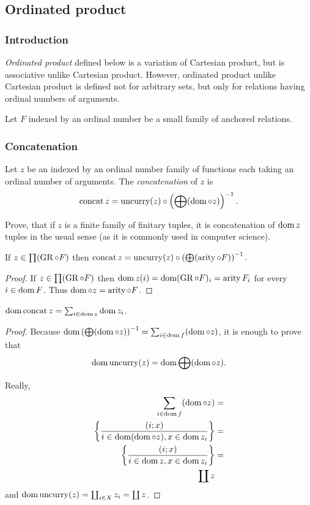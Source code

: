 \subsection{\label{ordinated-prod}Ordinated product}


\subsubsection{Introduction}

\emph{Ordinated product} defined below is a variation of Cartesian
product, but is associative unlike Cartesian product. However, ordinated
product unlike Cartesian product is defined not for arbitrary sets,
but only for relations having ordinal numbers of arguments.

Let $F$ indexed by an ordinal number be a small family of anchored
relations.


\subsubsection{Concatenation}
\begin{defn}
Let $z$ be an indexed by an ordinal number
family of functions each taking an ordinal number of arguments. The
\emph{concatenation} of $z$ is
\[
\operatorname{concat} z=\operatorname{uncurry}(z)\circ\left(\bigoplus(\operatorname{dom}\circ z)\right)^{-1}.
\]
\end{defn}
\begin{xca}
Prove, that if $z$ is a finite family of finitary tuples, it is concatenation
of $\operatorname{dom} z$ tuples in the usual sense (as it is commonly used in
computer science).\end{xca}
\begin{prop}
If $z\in\prod(\operatorname{GR}\circ F)$ then $\operatorname{concat} z=\operatorname{uncurry}(z)\circ\left(\bigoplus(\operatorname{arity}\circ F)\right)^{-1}.$\end{prop}
\begin{proof}
If $z\in\prod(\operatorname{GR}\circ F)$ then $\operatorname{dom} z(i)=\operatorname{dom}(\operatorname{GR}\circ F)_{i}=\operatorname{arity} F_{i}$
for every $i\in\operatorname{dom} F$. Thus $\operatorname{dom}\circ z=\operatorname{arity}\circ F$.\end{proof}
\begin{prop}
$\operatorname{dom}\operatorname{concat} z=\sum_{i\in\operatorname{dom} z}\operatorname{dom} z_{i}$.\end{prop}
\begin{proof}
Because $\operatorname{dom}\left(\bigoplus(\operatorname{dom}\circ z)\right)^{-1}=\sum_{i\in\operatorname{dom} f}(\operatorname{dom}\circ z)$,
it is enough to prove that
\[
\operatorname{dom}\operatorname{uncurry}(z)=\operatorname{dom}\bigoplus(\operatorname{dom}\circ z).
\]


Really,
\begin{align*}
\sum_{i\in\operatorname{dom} f}(\operatorname{dom}\circ z) & =\\
\left\{ \frac{(i;x)}{i\in\operatorname{dom}(\operatorname{dom}\circ z),x\in\operatorname{dom} z_{i}}\right\} & =\\
\left\{ \frac{(i;x)}{i\in\operatorname{dom} z,x\in\operatorname{dom} z_{i}}\right\} & =\\
\coprod z
\end{align*}
and $\operatorname{dom}\operatorname{uncurry}(z)=\coprod_{i\in X}z_{i}=\coprod z$.
\end{proof}

